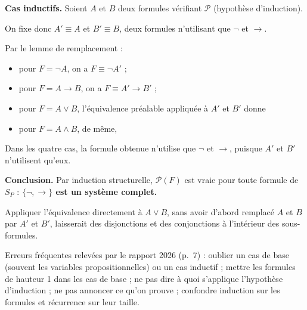 \documentclass[11pt,a4paper]{article}
\providecommand{\tightlist}{\setlength{\itemsep}{0pt}\setlength{\parskip}{0pt}}
\newcommand{\equationajustee}[1]{%
  \sbox{\boiteequation}{$\displaystyle #1$}%
  \ifdim\wd\boiteequation>\linewidth
    \[\resizebox{\linewidth}{!}{\usebox{\boiteequation}}\]%
  \else
    \[#1\]%
  \fi}
\begin{document}
\textbf{Cas inductifs.} Soient \(A\) et \(B\) deux formules vérifiant \(\mathcal{P}\) (hypothèse d'induction).

On fixe donc \(A' \equiv A\) et \(B' \equiv B\), deux formules n'utilisant que \(\neg\) et \(\to\).

Par le lemme de remplacement :

\begin{itemize}
\tightlist
\item
  pour \(F = \neg A\), on a \(F \equiv \neg A'\) ;
\item
  pour \(F = A \to B\), on a \(F \equiv A' \to B'\) ;
\item
  pour \(F = A \vee B\), l'équivalence préalable appliquée à \(A'\) et \(B'\) donne
\end{itemize}

\equationajustee{\begin{aligned}
F &\equiv A' \vee B' \\
&\equiv \neg A' \to B' ;
\end{aligned}}

\begin{itemize}
\tightlist
\item
  pour \(F = A \wedge B\), de même,
\end{itemize}

\equationajustee{\begin{aligned}
F &\equiv A' \wedge B' \\
&\equiv \neg(A' \to \neg B').
\end{aligned}}

Dans les quatre cas, la formule obtenue n'utilise que \(\neg\) et \(\to\), puisque \(A'\) et \(B'\) n'utilisent qu'eux.

\textbf{Conclusion.} Par induction structurelle, \(\mathcal{P}(F)\) est vraie pour toute formule de \(S_P\) : \textbf{\(\{\neg, \to\}\) est un système complet.}

\begin{piege}

Appliquer l'équivalence directement à \(A \vee B\), sans avoir d'abord remplacé \(A\) et \(B\) par \(A'\) et \(B'\), laisserait des disjonctions et des conjonctions à l'intérieur des sous-formules.

\end{piege}

\begin{piege}

Erreurs fréquentes relevées par le rapport 2026 (p.~7) : oublier un cas de base (souvent les variables propositionnelles) ou un cas inductif ; mettre les formules de hauteur 1 dans les cas de base ; ne pas dire à quoi s'applique l'hypothèse d'induction ; ne pas annoncer ce qu'on prouve ; confondre induction sur les formules et récurrence sur leur taille.

\end{piege}
\end{document}
